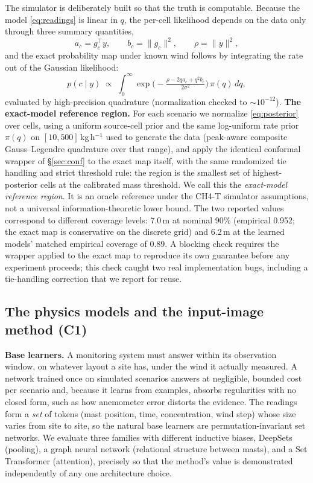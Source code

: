 \documentclass[conference]{IEEEtran}
\begin{document}
The simulator is deliberately built so that the truth is computable.
Because the model \eqref{eq:readings} is linear in $q$, the per-cell
likelihood depends on the data only through three summary quantities,
\begin{equation}
\label{eq:suffstats}
a_c = g_c^\top y, \qquad b_c = \lVert g_c\rVert^2, \qquad
\rho = \lVert y\rVert^2,
\end{equation}
and the exact probability map under known wind follows by integrating the
rate out of the Gaussian likelihood:
\begin{equation}
\label{eq:posterior}
p(c \mid y) \;\propto\;
\int_0^{\infty}\!
\exp\!\Big(\!-\tfrac{\rho - 2qa_c + q^2 b_c}{2\sigma^2}\Big)\,
\pi(q)\, dq,
\end{equation}
evaluated by high-precision quadrature (normalization checked to
$\sim$$10^{-12}$). \textbf{The exact-model reference region.} For each
scenario we normalize \eqref{eq:posterior} over cells, using a uniform
source-cell prior and the same log-uniform rate prior $\pi(q)$ on
$[10, 500]$\,kg\,h$^{-1}$ used to generate the data (peak-aware
composite Gauss--Legendre quadrature over that range), and apply the
identical conformal wrapper of \S\ref{sec:conf} to the exact map
itself, with the same randomized tie handling and strict threshold
rule: the region is the smallest set of highest-posterior cells at the
calibrated mass threshold. We call this the \emph{exact-model reference
region}. It is an oracle reference under the CH4-T simulator
assumptions, not a universal information-theoretic lower bound. The two
reported values correspond to different coverage levels: 7.0\,m at
nominal 90\% (empirical 0.952; the exact map is conservative on the
discrete grid) and 6.2\,m at the learned models' matched empirical
coverage of 0.89. A blocking check requires the wrapper applied to the
exact map to reproduce its own guarantee before any experiment
proceeds; this check caught two real implementation bugs, including a
tie-handling correction that we report for reuse.

\subsection{The physics models and the input-image method (C1)}
\label{sec:models}

\textbf{Base learners.}
A monitoring system must answer within its observation window, on
whatever layout a site has, under the wind it actually measured. A
network trained once on simulated scenarios answers at negligible,
bounded cost per scenario and,
because it learns from examples, absorbs regularities with no closed
form, such as how anemometer error distorts the evidence. The readings form a \emph{set} of tokens (mast
position, time, concentration, wind step) whose size varies from site to
site, so the natural base learners are permutation-invariant set
networks. We evaluate three families with different inductive biases,
DeepSets (pooling), a graph neural network (relational structure between
masts), and a Set Transformer (attention), precisely so that the
method's value is demonstrated independently of any one architecture
choice.
\end{document}
